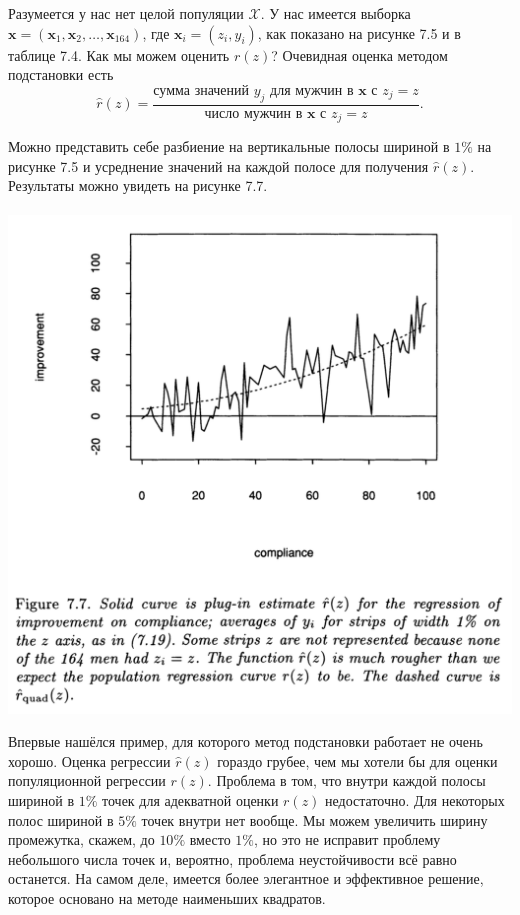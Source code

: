  Разумеется у нас нет целой популяции $\mathcal X$. У нас имеется выборка $\mathbf x = (\mathbf x_1, \mathbf x_2, \ldots, \mathbf x_{164})$, где $\mathbf x_i = (z_i, y_i)$, как показано на рисунке 7.5 и в таблице 7.4. Как мы можем оценить $r(z)$? Очевидная оценка методом подстановки есть
 \begin{equation}
  \hat r(z) = \frac{\text{сумма значений $y_j$ для мужчин в $\mathbf x$ с $z_j = z$}}{\text{число мужчин в $\mathbf x$ с $z_j = z$}}.
\end{equation}

Можно представить себе разбиение на вертикальные полосы шириной в $1\%$ на рисунке 7.5 и усреднение значений на каждой полосе для получения $\hat r(z).$ Результаты можно увидеть на рисунке 7.7.
\\~\\
\noindent
\includegraphics[width=0.9\linewidth]{6/f77.png}
\newline
\setcounter{figure}{7}

Впервые нашёлся пример, для которого метод подстановки работает не очень хорошо. Оценка регрессии $\hat r(z)$ гораздо грубее, чем мы хотели бы для оценки популяционной регрессии $r(z)$. Проблема в том, что внутри каждой полосы шириной в $1\%$ точек для адекватной оценки $r(z)$ недостаточно. Для некоторых полос шириной в $5\%$ точек внутри нет вообще. Мы можем увеличить ширину промежутка, скажем, до $10\%$ вместо $1\%$, но это не исправит проблему небольшого числа точек и, вероятно, проблема неустойчивости всё равно останется. На самом деле, имеется более элегантное и эффективное решение, которое основано на методе наименьших квадратов.

